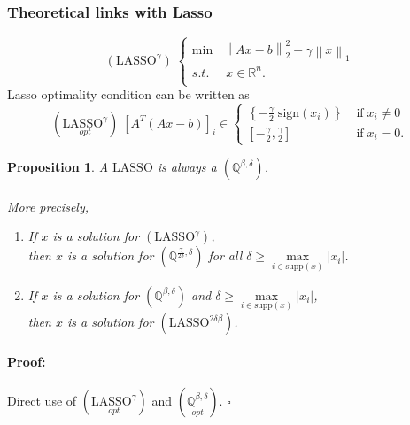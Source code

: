 \documentclass[fleqn]{report} %
\newcommand\ddfrac[2]{\frac{\displaystyle #1}{\displaystyle #2}}
\newtheorem{thm}{Proposition}[subsection]
\newenvironment{proof}{\paragraph{Proof:}}{\hfill$\square$}
\begin{document}
\subsubsection{Theoretical links with Lasso}
\begin{equation}
		\label{Lasso_Regularization}
		(\text{LASSO}^{\gamma})\;
		\left\{
		\begin{array}{ll}\min & \left\|Ax-b\right\|^2_2 + \gamma\left\|x\right\|_1\\
			s.t.&\;x\in\mathbb{R}^n.\\
		\end{array} 
		\right.
    \end{equation}
Lasso optimality condition can be written as
\[
\left(\underset{opt}{\text{LASSO}^{\gamma}}\right)\;\left[A^T(Ax-b)\right]_i\in 
\left\{ \begin{array}{ll}
\left\{-\ddfrac{\gamma}{2}\;\text{sign}(x_i)\right\} &\;\text{if}\; x_i\neq 0\\
\left[-\ddfrac{\gamma}{2}, \ddfrac{\gamma}{2}\right]&\;\text{if}\; x_i =0.
\end{array}
\right.
\]
\begin{thm} A $\text{LASSO}$ is always a $(\mathbb{Q}^{\beta,\delta})$.\\\\
More precisely,
\begin{enumerate}
\item If $x$ is a solution for $(\text{LASSO}^{\gamma})$,\\ then  $x$ is a solution for $(\mathbb{Q}^{\ddfrac{\gamma}{2\delta},\delta})$ for all $\delta\geq
\underset{i\in\text{supp}(x)}{\max}\left|x_i\right|$.
\item If $x$ is a solution for $(\mathbb{Q}^{\beta,\delta})$ and $\delta\geq\underset{i\in\text{supp}(x)}{\max}\left|x_i\right|$, \\ then $x$ is a solution for $(\text{LASSO}^{2\delta\beta})$.
\end{enumerate}
\end{thm}
\begin{proof}
    Direct use of $\left(\underset{opt}{\text{LASSO}^{\gamma}}\right)$ and $\left(\underset{opt}{\mathbb{Q}^{\beta,\delta}}\right)$.
\end{proof}
\end{document}
